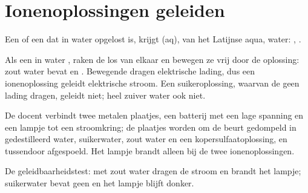 \section{Ionenoplossingen geleiden}

\begin{notation}[De toestandsaanduiding (aq)]\label{not:g9:ions:aq}
Een  of een  dat in water opgelost is, krijgt (aq), van
het Latijnse aqua, water: , .
\end{notation}

\begin{proposition}\label{prop:g9:ions:conduct}
Als een  in water , raken de  los van elkaar en
bewegen ze vrij door de oplossing: zout water bevat  en
. Bewegende  dragen elektrische lading, dus een
ionenoplossing geleidt elektrische stroom. Een suikeroplossing, waarvan
de  geen lading dragen, geleidt niet; heel zuiver water ook
niet.
\end{proposition}

\begin{inthelab}
De docent verbindt twee metalen plaatjes, een batterij met een lage
spanning en een lampje tot een stroomkring; de plaatjes worden om de
beurt gedompeld in gedestilleerd water, suikerwater, zout water en een
kopersulfaatoplossing, en tussendoor afgespoeld. Het lampje brandt alleen
bij de twee ionenoplossingen.
\end{inthelab}

\begin{omfigure}

{\small De geleidbaarheidstest: met zout water dragen  de stroom en
brandt het lampje; suikerwater bevat geen  en het lampje blijft
donker.}
\end{omfigure}

